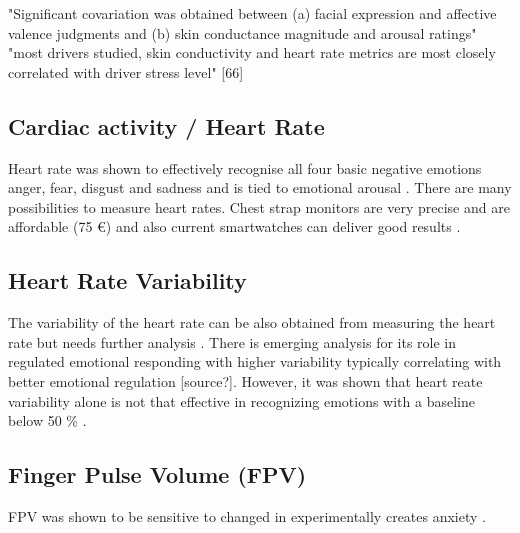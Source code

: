 "Significant covariation was obtained between (a) facial expression and affective valence judgments and (b) skin conductance magnitude and arousal ratings" \cite{lang93pictures}
"most drivers studied, skin conductivity and heart rate metrics are most closely correlated with driver stress level" [66]


\subsection{Cardiac activity / Heart Rate}
Heart rate was shown to effectively recognise all four basic negative emotions anger, fear, disgust and sadness \cite{levenson2003blood} and is tied to emotional arousal \cite{nacke2015physiological}. There are many possibilities to measure heart rates. Chest strap monitors are very precise and are affordable (75 €) \cite{link_herzfrequenzsensor} and also current smartwatches can deliver good results \cite{gillinov2017variable}.

\subsection{Heart Rate Variability}
The variability of the heart rate can be also obtained from measuring the heart rate but needs further analysis \cite{nacke2015physiological}. There is emerging analysis for its role in regulated emotional responding \cite{appelhans2006heat} with higher variability typically correlating with better emotional regulation [source?]. However, it was shown that heart reate variability alone is not that effective in recognizing emotions with a baseline below 50 \% \cite{ferdinando2014emotion}.


\subsection{Finger Pulse Volume (FPV)}
FPV was shown to be sensitive to changed in experimentally creates anxiety \cite{bloom77finger}.

